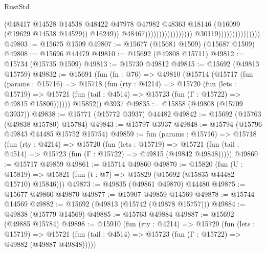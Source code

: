 \begin{lexlean}{RustStd}
\begin{coremodule}
                                                                      (@48417
                                                                        @14528
                                                                        @14538
                                                                        @48422
                                                                        @47978
                                                                        @47982
                                                                        @48363
                                                                        @18146
                                                                        (@16099
                                                                          (@19629 @14538 @14529))
                                                                        @16249))
                                                                    @48467)))))))))))))))))
                                  @30119)))))))))))))))
@49803 := @15675 @1509
@49807 := @15677 (@15681 @1509) (@15687 @1509)
@49808 := @15696 @44479
@49810 := @15692 (@49808 @15711)
@49812 := @15734 (@15735 @1509)
@49813 := @15730 @49812
@49815 := @15692 (@49813 @15759)
@49832 := @15691
    (fun (fn : @76) =>
    @49810
      (@15714
        (@15717
          (fun (params : @15716) =>
          @15718
            (fun (rty : @4214) =>
            @15720
              (fun (lets : @15719) =>
              @15721 (fun (tail : @4514) => @15723 (fun (Γ : @15722) => @49815 @15806))))))
        @15852))
    @3937
@49835 := @15858 (@49808 (@15709 @3937))
@49838 := @15771 (@15772 @3937) @44482
@49842 := @15692 (@15763 (@49838 @15780) @15784)
@49843 := @15797 @3937
@49848 := @15794 (@15796 @49843 @44485 @15752 @15754)
@49859 := fun (params : @15716) =>
  @15718
    (fun (rty : @4214) =>
    @15720
      (fun (lets : @15719) =>
      @15721 (fun (tail : @4514) => @15723 (fun (Γ : @15722) => @49815 (@49842 @49848)))))
@49860 := @15717 @49859
@49861 := @15714 @49860
@49870 := @15820
    (fun (U : @15819) => @15821 (fun (t : @7) => @15829 (@15692 (@15835 @44482 @15710) @15846)))
@49873 := @49835 (@49861 @49870) @44480
@49875 := @15677 @49860 @49870
@49877 := @15907 @49859 @14569
@49878 := @15744 @14569
@49882 := @15692 (@49813 (@15742 (@49878 @15757)))
@49884 := @49838 (@15779 @14569)
@49885 := @15763 @49884
@49887 := @15692 (@49885 @15784)
@49898 := @15910
    (fun (rty : @4214) =>
    @15720
      (fun (lets : @15719) =>
      @15721 (fun (tail : @4514) => @15723 (fun (Γ : @15722) => @49882 (@49887 @49848)))))

\end{coremodule}
\end{lexlean}
